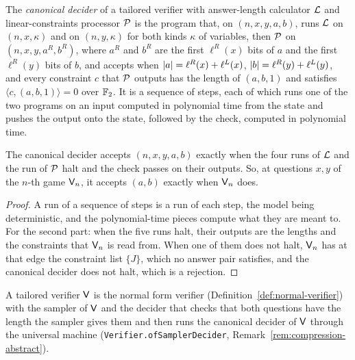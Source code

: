 \begin{definition}
\label{def:canonical-decider}
\leanok
The \emph{canonical decider} of a tailored verifier with answer-length calculator $\cal{L}$ and
linear-constraints processor $\cal{P}$ is the program that, on $(n, x, y, a, b)$, runs $\cal{L}$
on $(n, x, \kappa)$ and on $(n, y, \kappa)$ for both kinds $\kappa$ of variables, then $\cal{P}$ on
$(n, x, y, a^R, b^R)$, where $a^R$ and $b^R$ are the first $\ell^R(x)$ bits of $a$ and the first
$\ell^R(y)$ bits of $b$, and accepts when $\abs{a} = \ell^R(x) + \ell^L(x)$,
$\abs{b} = \ell^R(y) + \ell^L(y)$, and every constraint $c$ that $\cal{P}$ outputs has the length
of $(a, b, 1)$ and satisfies $\langle c, (a, b, 1)\rangle = 0$ over $\F_2$. It is a sequence of
steps, each of which runs one of the two programs on an input computed in polynomial time from
the state and pushes the output onto the state, followed by the check, computed in polynomial
time.
\end{definition}

\begin{lemma}
\label{lem:canonical-decider}
\leanok
The canonical decider accepts $(n, x, y, a, b)$ exactly when the four runs of $\cal{L}$ and the
run of $\cal{P}$ halt and the check passes on their outputs. So, at questions $x, y$ of the
$n$-th game $\verifier_n$, it accepts $(a, b)$ exactly when $\verifier_n$ does.
\end{lemma}

\begin{proof}
\leanok
A run of a sequence of steps is a run of each step, the model being deterministic, and the
polynomial-time pieces compute what they are meant to. For the second part: when the five runs
halt, their outputs are the lengths and the constraints that $\verifier_n$ is read from. When one
of them does not halt, $\verifier_n$ has at that edge the constraint list $\{J\}$, which no answer
pair satisfies, and the canonical decider does not halt, which is a rejection.
\end{proof}

\begin{definition}
\label{def:of-tnfv}
\leanok
A tailored verifier $\verifier$ is the normal form verifier (Definition~\ref{def:normal-verifier})
with the sampler of $\verifier$ and the decider that checks that both questions have the length
the sampler gives them and then runs the canonical decider of $\verifier$ through the universal
machine (\texttt{Verifier.ofSamplerDecider}, Remark~\ref{rem:compression-abstract}).
\end{definition}

